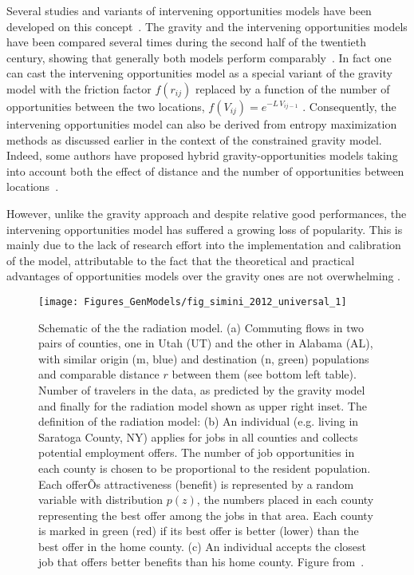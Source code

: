 Several studies and variants of intervening opportunities models have been developed on this concept~\cite{heanus_1966_comparative, ruiter_1967_toward, haynes_1973_intermetropolitan, wilson_1970_urban, fik_1990_spatial, akwawua_2001_development}. The gravity and the intervening opportunities models have been compared several times during the second half of the twentieth century, showing that generally both models perform comparably~\cite{david_1961_comparison, pyers_1966_evaluation, lawson_1967_comparison, zhao_2001_refinement}. In fact one can cast the intervening opportunities model as a special variant of the gravity model with the friction factor $f(r_{ij})$ replaced by a function of the number of opportunities between the two locations, $f(V_{ij}) = e^{-L \, V_{ij-1}}$ \cite{eash_1984_development, zhao_2001_refinement}. Consequently, the intervening opportunities model can also be derived from entropy maximization methods as discussed earlier in the context of the constrained gravity model.  Indeed, some authors  have proposed hybrid gravity-opportunities models taking into account both the effect of distance and the number of opportunities between locations~\cite{willis_1986_flexible, goncalves_1993_development}.

However, unlike the gravity approach and despite relative good performances, the intervening opportunities model has suffered a growing loss of popularity. This is mainly due to the lack of research effort into the implementation and calibration of the model, attributable to the fact that the theoretical and practical advantages of opportunities models over the gravity ones are not overwhelming \cite{ortuzar_2011_modeling}.

\begin{figure}[t!]
\centering
\texttt{[image: Figures\_GenModels/fig\_simini\_2012\_universal\_1]}
\caption{ Schematic of the the radiation model. (a) Commuting flows in two pairs of counties,
one in Utah (UT) and the other in Alabama (AL), with similar
origin (m, blue) and destination (n, green) populations and comparable distance $r$ between
them (see bottom left table). Number of travelers in the data, as predicted by the gravity model and finally for the radiation model shown as upper right inset. The definition of
the radiation model: (b) An individual (e.g. living in Saratoga County, NY) applies for
jobs in all counties and collects potential employment offers. The number of job
opportunities in each county is chosen to be proportional to the resident
population. Each offerÕs attractiveness (benefit) is represented by a random variable
with distribution $p(z)$, the numbers placed in each county representing the best offer
among the jobs in that area. Each county is marked in green (red) if its best offer
is better (lower) than the best offer in the home county. (c) An individual
accepts the closest job that offers better benefits than his home county.  Figure from~\cite{simini_2012_universal}. 
\label{fig:fig_simini_2012_universal_1}}
\end{figure}


